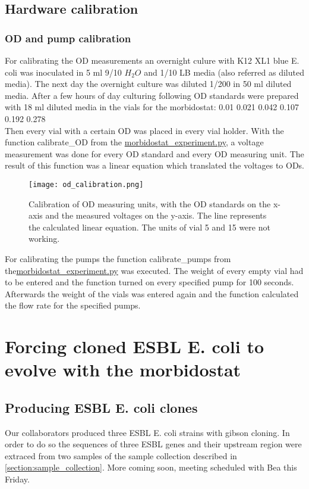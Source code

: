 \subsection{Hardware calibration}
\subsubsection{OD and pump calibration}
For calibrating the OD measurements an overnight culure with K12 XL1 blue E. coli was inoculated in 5 ml 9/10 $H_2O$ and 1/10 LB media (also referred as diluted media). The next day the overnight culture was diluted 1/200 in 50 ml diluted media. After a few hours of day culturing following OD standards were prepared with 18 ml diluted media in the vials for the morbidostat: 0.01 0.021 0.042 0.107 0.192 0.278\\
Then every vial with a certain OD was placed in every vial holder. With the function calibrate\_OD from the \href{https://github.com/nahanoo/ESBL\_project/}{morbidostat\_experiment.py}, a voltage measurement was done for every OD standard and every OD measuring unit. The result of this function was a linear equation which translated the voltages to ODs. \\
\begin{figure}
	\texttt{[image: od\_calibration.png]}
	\caption{Calibration of OD measuring units, with the OD standards on the x-axis and the measured voltages on the y-axis. The line represents the calculated linear equation. The units of vial 5 and 15 were not working.}
\end{figure}
For calibrating the pumps the function calibrate\_pumps from the\href{https://github.com/nahanoo/ESBL\_project/}{morbidostat\_experiment.py} was executed. The weight of every empty vial had to be entered and the function turned on every specified pump for 100 seconds. Afterwards the weight of the vials was entered again and the function calculated the flow rate for the specified pumps. 
\label{section:OD_calibration}

\section{Forcing cloned ESBL E. coli to evolve with the morbidostat}
\subsection{Producing ESBL E. coli clones}
Our collaborators produced three ESBL E. coli strains with gibson cloning. In order to do so the sequences of three ESBL genes and their upstream region were extraced from two samples of the sample collection described in \ref{section:sample_collection}. More coming soon, meeting scheduled with Bea this Friday.  

